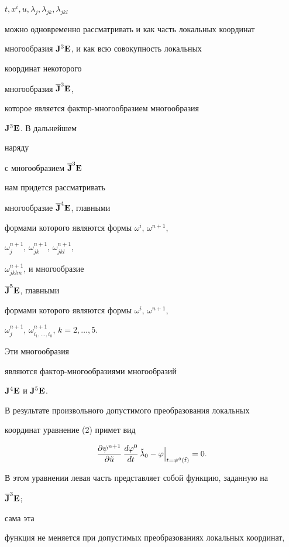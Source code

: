 $t,x^i,u,\lambda_j,\lambda_{jk},\lambda_{jkl}$ 


можно одновременно рассматривать и как часть локальных координат  


многообразия $\bold J^3\bold E$, и как всю совокупность локальных 


координат некоторого 


многообразия $\overline{\bold J}^3\bold E$, 


которое является фактор-многообразием многообразия 


$\bold J^3\bold E$. В дальнейшем


наряду 


с многообразием $\overline{\bold J}^3\bold E$


нам придется рассматривать 


многообразие $\overline{\bold J}^4\bold E$, главными  


формами которого являются формы $\omega^i$, $\omega^{n+1}$, 


$\omega^{n+1}_j$, $\omega^{n+1}_{jk}$, $\omega^{n+1}_{jkl}$, 


$\omega^{n+1}_{jklm}$, и многообразие 


$\overline{\bold J}^5\bold E$, главными 


формами которого являются формы $\omega^i$, $\omega^{n+1}$, 


$\omega^{n+1}_j$, $\omega^{n+1}_{i_1,\dotsc,i_k}$, $k=2,\dotsc,5$. 


Эти многообразия 


являются фактор-многообразиями многообразий 


$\bold J^4\bold E$ и $\bold J^5\bold E$. 


 


В результате произвольного допустимого преобразования локальных 


координат уравнение (2) примет вид 


$$ 


\frac{\partial\psi^{n+1}}{\partial\Tilde u}\, 


\frac{d\varphi^0}{dt}\,\Tilde\lambda_0-\varphi


\Big|_{t=\psi^0(\Tilde t)}=0. 


$$ 


В этом уравнении левая часть представляет собой функцию, заданную на 


$\overline{\bold J}^3\bold E$; 


сама эта 


функция не меняется при допустимых преобразованиях локальных координат, 


